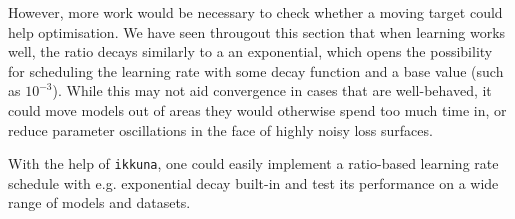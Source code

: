 However, more work would be necessary to check whether a moving target could
help optimisation. We have seen througout this section that  when learning works
well, the ratio decays similarly to a an exponential, which opens the
possibility for scheduling the learning rate with some decay function and a base
value (such as $10^{-3}$).  While this may not aid convergence in cases that are
well-behaved, it could move models out of areas they would otherwise spend too
much time in, or reduce parameter oscillations in the face of highly noisy loss
surfaces.

With the help of \texttt{ikkuna}, one could easily implement a ratio-based
learning rate schedule with e.g. exponential decay built-in and test its
performance on a wide range of models and datasets.
